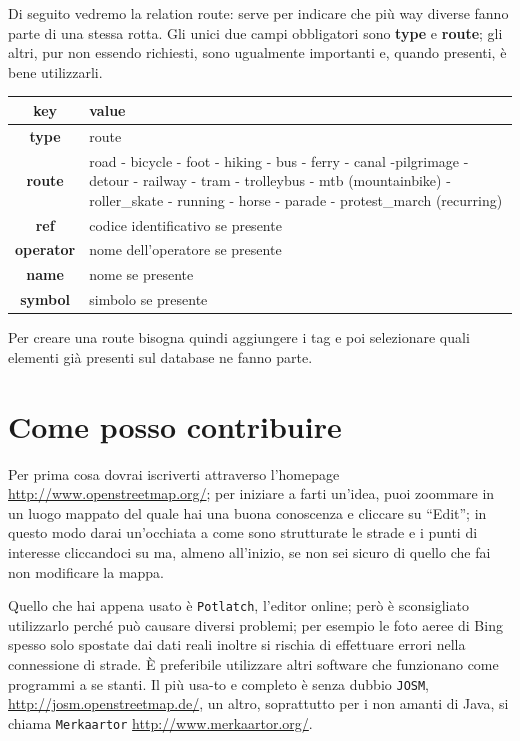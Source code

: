 \documentclass[a4paper,twoside,12pt,]{article}
\newcommand{\key}[1]{\textsf{\textbf{#1}}}
\newcommand{\val}[1]{\textsf{#1}}
\newcommand{\soft}[1]{\texttt{#1}}
\begin{document}
Di seguito vedremo la relation route: serve per indicare che più way diverse fanno parte di una stessa rotta. Gli unici due campi obbligatori sono \key{type} e \key{route}; gli altri, pur non essendo richiesti, sono ugualmente importanti e, quando presenti, è bene utilizzarli.
\begin{center}
 \begin{tabular}{cp{9cm}}
  \toprule
   \textbf{key} & \textbf{value} \\
  \midrule
   \key{type} & \val{route} \\
   \key{route} & \val{road} - \val{bicycle} - \val{foot} - \val{hiking} - \val{bus} - \val{ferry} - \val{canal} -\val{pilgrimage} - \val{detour} - \val{railway} - \val{tram} - \val{trolleybus} - \val{mtb (mountainbike)} - \val{roller\_skate} - \val{running} - \val{horse} - \val{parade} - \val{protest\_march (recurring)} \\
   \key{ref} & \val{codice identificativo se presente}\\
   \key{operator} & \val{nome dell'operatore se presente} \\
   \key{name} & \val{nome se presente} \\
   \key{symbol} & \val{simbolo se presente} \\
  \bottomrule
\end{tabular}
\end{center}
Per creare una route bisogna quindi aggiungere i tag e poi selezionare quali elementi già presenti sul database ne fanno parte.

\section{Come posso contribuire}
Per prima cosa dovrai iscriverti attraverso l'homepage \url{http://www.openstreetmap.org/}; per iniziare a farti un'idea, puoi zoommare in un luogo mappato del quale hai una buona conoscenza e cliccare su ``Edit''; in questo modo darai un'occhiata a come sono strutturate le strade e i punti di interesse cliccandoci su ma, almeno all'inizio, se non sei sicuro di quello che fai non modificare la mappa.

Quello che hai appena usato è \soft{Potlatch}, l'editor online; però è sconsigliato utilizzarlo perché può causare diversi problemi; per esempio le foto aeree di Bing spesso solo spostate dai dati reali inoltre si rischia di effettuare errori nella connessione di strade. È preferibile utilizzare altri software che funzionano come programmi a se stanti. Il più usa-to e completo è senza dubbio \soft{JOSM}, \url{http://josm.openstreetmap.de/}, un altro, soprattutto per i non amanti di Java, si chiama \soft{Merkaartor} \url{http://www.merkaartor.org/}.
\end{document}

